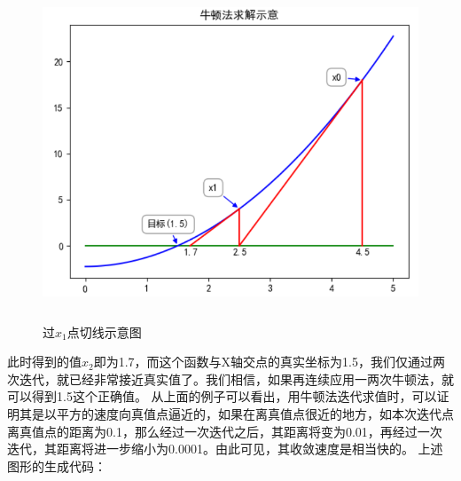 \documentclass[UTF8]{article}
\begin{document}
\begin{figure}[H]
	\caption{过$x_{1}$点切线示意图}
	\label{f000025}
	\centering
	\includegraphics[height=10cm]{images/f000025}
\end{figure}
此时得到的值$x_{2}$即为1.7，而这个函数与X轴交点的真实坐标为1.5，我们仅通过两次迭代，就已经非常接近真实值了。我们相信，如果再连续应用一两次牛顿法，就可以得到1.5这个正确值。\newline
从上面的例子可以看出，用牛顿法迭代求值时，可以证明其是以平方的速度向真值点逼近的，如果在离真值点很近的地方，如本次迭代点离真值点的距离为0.1，那么经过一次迭代之后，其距离将变为0.01，再经过一次迭代，其距离将进一步缩小为0.0001。由此可见，其收敛速度是相当快的。\newline
上述图形的生成代码：
\end{document}
